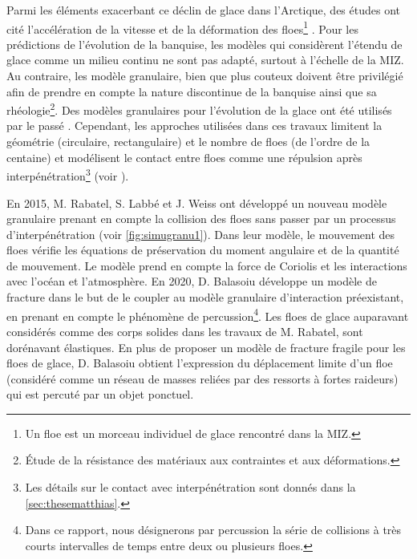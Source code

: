 Parmi les éléments exacerbant ce déclin de glace dans l'Arctique, des études ont cité l'accélération de la vitesse et de la déformation des floes\footnote{Un floe est un morceau individuel de glace rencontré dans la MIZ.} \parencite{rampal2011ipcc,spreen2011trends}. Pour les prédictions de l'évolution de la banquise, les modèles qui considèrent l'étendu de glace comme un milieu continu ne sont pas adapté, surtout à l'échelle de la MIZ. Au contraire, les modèle granulaire, bien que plus couteux doivent être privilégié afin de prendre en compte la nature discontinue de la banquise ainsi que sa rhéologie\footnote{Étude de la résistance des matériaux aux contraintes et aux déformations.}. Des modèles granulaires pour l'évolution de la glace ont été utilisés par le passé \parencite{hopkins1996mesoscale,kjerstad2014modeling}. Cependant, les approches utilisées dans ces travaux limitent la géométrie (circulaire, rectangulaire) et le nombre de floes (de l'ordre de la centaine) et modélisent le contact entre floes comme une répulsion après interpénétration\footnote{Les détails sur le contact avec interpénétration sont donnés dans la \cref{sec:thesematthias}.} (voir \parencite[p.16]{balasoiu2020halthesis}). 

En 2015, M. Rabatel, S. Labbé et J. Weiss \parencite{rabatel2015dynamics,rabatel2015thesis} ont développé un nouveau modèle granulaire prenant en compte la collision des floes sans passer par un processus d’interpénétration (voir \cref{fig:simugranu1}). Dans leur modèle, le mouvement des floes vérifie les équations de préservation du moment angulaire et de la quantité de mouvement. Le modèle prend en compte la force de Coriolis et les interactions avec l’océan et l’atmosphère. En 2020, D. Balasoiu \parencite{balasoiu2020halthesis} développe un modèle de fracture dans le but de le coupler au modèle granulaire d'interaction préexistant, en prenant en compte le phénomène de percussion\footnote{Dans ce rapport, nous désignerons par percussion la série de collisions à très courts intervalles de temps entre deux ou plusieurs floes.}. Les floes de glace auparavant considérés comme des corps solides dans les travaux de M. Rabatel, sont dorénavant élastiques. En plus de proposer un modèle de fracture fragile pour les floes de glace, D. Balasoiu obtient l’expression du déplacement limite d'un floe (considéré comme un réseau de masses reliées par des ressorts à fortes raideurs) qui est percuté par un objet ponctuel.

